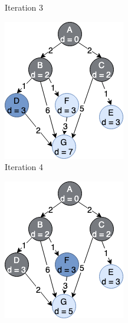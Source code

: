 \begin{figure}[h!]
\begin{subfigure}[b]{0.2\linewidth}
    \caption{Iteration 3}
  \end{subfigure}
  \hfill
  \begin{subfigure}[b]{0.2\linewidth}
    \includegraphics[width=\linewidth]{images/dijkstra_expansion4.png}
     \caption{Iteration 4}
  \end{subfigure}
  \newline
  \begin{subfigure}[b]{0.2\linewidth}
    \includegraphics[width=\linewidth]{images/dijkstra_expansion5.png}

\end{subfigure}
\end{figure}
